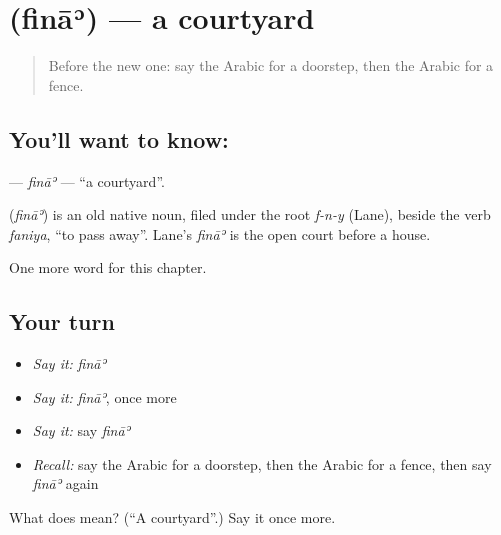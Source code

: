 \section[\texorpdfstring{\ar{فناء} (fināʾ)}{فناء (fināʾ)}]{ (fināʾ) — a courtyard}

\label{lesson:AR-C266-fina}



\begin{quote}
Before the new one: say the Arabic for a doorstep, then the Arabic for a fence.
\end{quote}

\subsection*{You'll want to know: }
\textbf{} — \emph{fināʾ} — \textquotedblleft{}a courtyard\textquotedblright{}.

\begin{cousinweb}
\textbf{} (\emph{fināʾ}) is an old native noun, filed under the root \emph{f-n-y} (Lane), beside the verb \emph{faniya}, \textquotedblleft{}to pass away\textquotedblright{}. Lane's \emph{fināʾ} is the open court before a house.
\end{cousinweb}

\begin{grammarlens}[title={What you've built}]
One more word for this chapter.
\end{grammarlens}

\subsection*{Your turn}
\begin{itemize}
\raggedright
  \item \emph{Say it:} \emph{fināʾ}
  \item \emph{Say it:} \emph{fināʾ}, once more
  \item \emph{Say it:} say \emph{fināʾ}
  \item \emph{Recall:} say the Arabic for a doorstep, then the Arabic for a fence, then say \emph{fināʾ} again
\end{itemize}

\begin{tcolorbox}[breakable,colback=teal!4,colframe=teal!35!black,title={Before you move on}]
What does  mean? (\textquotedblleft{}A courtyard\textquotedblright{}.) Say it once more.
\end{tcolorbox}
